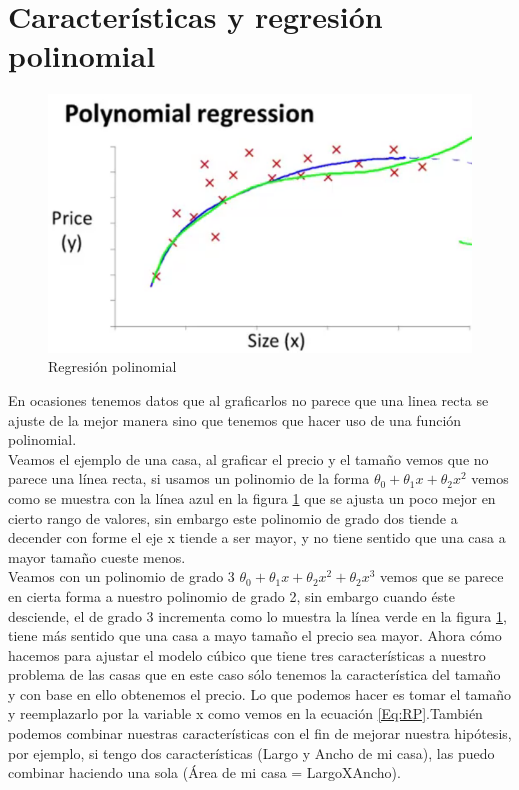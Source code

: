 \documentclass{report}
\begin{document}
\section{Características y regresión polinomial}
\begin{figure}
	\includegraphics[scale=0.3]{img/RP}
	\caption{Regresión polinomial}
	\label{Fig:RP}
\end{figure}
En ocasiones tenemos datos que al graficarlos no parece que una linea recta se ajuste de la mejor manera sino que tenemos que hacer uso de una función polinomial.\\Veamos el ejemplo de una casa, al graficar el precio y el tamaño vemos que no parece una línea recta, si usamos un polinomio de la forma $\theta_0 + \theta_1x+\theta_2x^2$ vemos como se muestra con la línea azul en la figura \ref{Fig:RP} que se ajusta un poco mejor en cierto rango de valores, sin embargo este polinomio de grado dos tiende a decender con forme el eje x tiende a ser mayor, y no tiene sentido que una casa a mayor tamaño cueste menos.\\Veamos con un polinomio de grado 3 $\theta_0 + \theta_1x+\theta_2x^2+\theta_2x^3$ vemos que se parece en cierta forma a nuestro polinomio de grado 2, sin embargo cuando éste desciende, el de grado 3 incrementa como lo muestra la línea verde en la figura \ref{Fig:RP}, tiene más sentido que una casa a mayo tamaño el precio sea mayor.
Ahora cómo hacemos para ajustar el modelo cúbico que tiene tres características a nuestro problema de las casas que en este caso sólo tenemos la característica del tamaño y con base en ello obtenemos el precio. Lo que podemos hacer es tomar el tamaño y reemplazarlo por la variable x como vemos en la ecuación \ref{Eq:RP}.También podemos combinar nuestras características con el fin de mejorar nuestra hipótesis, por ejemplo, si tengo dos características (Largo y Ancho de mi casa), las puedo combinar haciendo una sola (Área de mi casa = LargoXAncho).
\end{document}
